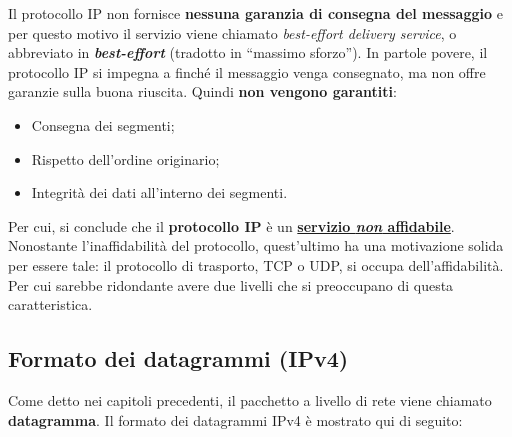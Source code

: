 \documentclass[a4paper]{article}
\newcommand{\dquotes}[1]{``#1''}
\begin{document}
	\noindent
	Il protocollo IP non fornisce \textbf{nessuna garanzia di consegna del messaggio} e per questo motivo il servizio viene chiamato \emph{best-effort delivery service}, o abbreviato in \textbf{\emph{best-effort}} (tradotto in \dquotes{massimo sforzo}). In partole povere, il protocollo IP si impegna a finché il messaggio venga consegnato, ma non offre garanzie sulla buona riuscita. Quindi \textbf{non vengono garantiti}:
	\begin{itemize}
		\item Consegna dei segmenti;
		\item Rispetto dell'ordine originario;
		\item Integrità dei dati all'interno dei segmenti.
	\end{itemize}
	Per cui, si conclude che il \textbf{protocollo IP} è un \underline{\textbf{servizio \emph{non} affidabile}}. Nonostante l'inaffidabilità del protocollo, quest'ultimo ha una motivazione solida per essere tale: il protocollo di trasporto, TCP o UDP, si occupa dell'affidabilità. Per cui sarebbe ridondante avere due livelli che si preoccupano di questa caratteristica.\newpage
	
	\subsection{Formato dei datagrammi (IPv4)}
	
	Come detto nei capitoli precedenti, il pacchetto a livello di rete viene chiamato \textcolor{Red3}{\textbf{datagramma}}. Il formato dei datagrammi IPv4 è mostrato qui di seguito:
	
\end{document}
